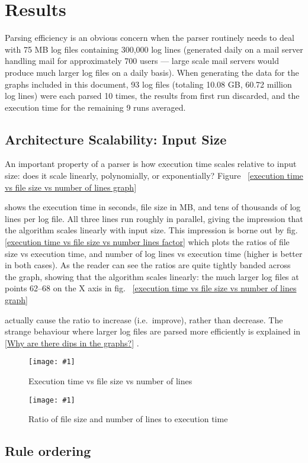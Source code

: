 \documentclass[draft]{svmult}
\newcommand{\showgraph}[3]{%
    \begin{figure}[hbt!]
        \caption{#2}\label{#3}
        \texttt{[image: \#1]}
    \end{figure}
}
\newcommand{\refwithpage}[1]{%
    \empty{}\vref{#1}%
}
\newcommand{\sectionref}[1]{%
    \textsection{}\vref*{#1}%
}
\newcommand{\numberOFlogFILES}[0]{%
    93%
}
\newcommand{\numberOFlogLINEShuman}[0]{%
    60.72 million%
}
\begin{document}
\section{Results}

Parsing efficiency is an obvious concern when the parser routinely needs to
deal with 75 MB log files containing 300,000 log lines (generated daily on
a mail server handling mail for approximately 700 users --- large scale
mail servers would produce much larger log files on a daily basis).  When
generating the data for the graphs included in this document,
\numberOFlogFILES{} log files (totaling 10.08 GB, \numberOFlogLINEShuman{}
log lines) were each parsed 10 times, the results from first run discarded,
and the execution time for the remaining 9 runs averaged.

\subsection{Architecture Scalability: Input Size}

An important property of a parser is how execution time scales relative to
input size: does it scale linearly, polynomially, or exponentially?
Figure~\refwithpage{execution time vs file size vs number of lines graph}
shows the execution time in seconds, file size in MB, and tens of thousands
of log lines per log file.  All three lines run roughly in parallel, giving
the impression that the algorithm scales linearly with input size.
This impression is borne out by fig.~\refwithpage{execution time vs file
size vs number lines factor} which plots the ratios of file size vs
execution time, and number of log lines vs execution time (higher
is better in both cases).  As the reader can see the ratios are quite
tightly banded across the graph, showing that the algorithm scales
linearly: the much larger log files at points 62--68 on the X axis in
fig.~\refwithpage{execution time vs file size vs number of lines graph}
actually cause the ratio to increase (i.e.\ improve), rather than decrease.
The strange behaviour where larger log files are parsed more efficiently is
explained in \sectionref{Why are there dips in the graphs?}.
\showgraph{build/plot-normal-filesize-numlines}{Execution time vs file size
vs number of lines}{execution time vs file size vs number of lines graph}
\showgraph{build/plot-normal-filesize-numlines-factor}{Ratio of file size
and number of lines to execution time}{execution time vs file size vs
number lines factor}

\subsection{Rule ordering}
\end{document}
